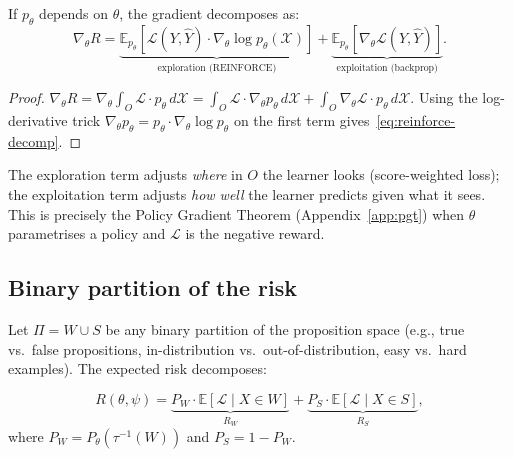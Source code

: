 \begin{proposition}
\label{prop:reinforce-decomp}
If $p_\theta$ depends on $\theta$, the gradient decomposes as:
\begin{equation}
\label{eq:reinforce-decomp}
\boxed{
    \nabla_\theta R = \underbrace{\mathbb{E}_{p_\theta}\!\left[\mathcal{L}(Y, \hat{Y}) \cdot \nabla_\theta \log p_\theta(\mathcal{X})\right]}_{\text{exploration (REINFORCE)}} + \underbrace{\mathbb{E}_{p_\theta}\!\left[\nabla_\theta \mathcal{L}(Y, \hat{Y})\right]}_{\text{exploitation (backprop)}}.
}
\end{equation}
\end{proposition}

\begin{proof}
$\nabla_\theta R = \nabla_\theta \int_O \mathcal{L} \cdot p_\theta \, d\mathcal{X} = \int_O \mathcal{L} \cdot \nabla_\theta p_\theta \, d\mathcal{X} + \int_O \nabla_\theta \mathcal{L} \cdot p_\theta \, d\mathcal{X}$.
Using the log-derivative trick $\nabla_\theta p_\theta = p_\theta \cdot \nabla_\theta \log p_\theta$ on the first term gives~\eqref{eq:reinforce-decomp}. \qedhere
\end{proof}

The exploration term adjusts \emph{where} in $O$ the learner looks (score-weighted loss); the exploitation term adjusts \emph{how well} the learner predicts given what it sees. This is precisely the Policy Gradient Theorem (Appendix~\ref{app:pgt}) when $\theta$ parametrises a policy and $\mathcal{L}$ is the negative reward.


\subsection{Binary partition of the risk}

Let $\Pi = W \cup S$ be any binary partition of the proposition space (e.g., true vs.\ false propositions, in-distribution vs.\ out-of-distribution, easy vs.\ hard examples). The expected risk decomposes:

\begin{equation}
\label{eq:ws-decomp}
    R(\theta, \psi) = \underbrace{P_W \cdot \mathbb{E}[\mathcal{L} \mid X \in W]}_{R_W} + \underbrace{P_S \cdot \mathbb{E}[\mathcal{L} \mid X \in S]}_{R_S},
\end{equation}
where $P_W = P_\theta(\tau^{-1}(W))$ and $P_S = 1 - P_W$.


